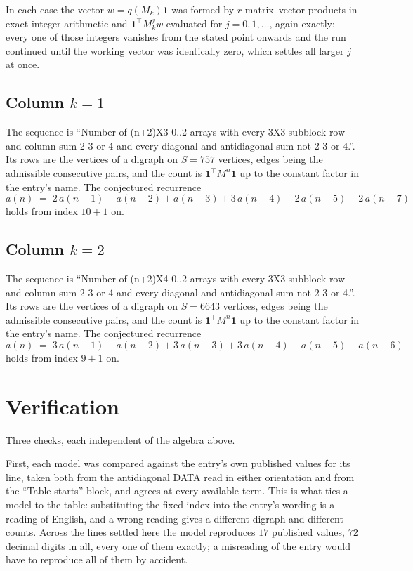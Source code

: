 \documentclass[11pt,a4paper]{article}
\theoremstyle{plain}
\theoremstyle{definition}
\begin{document}
In each case the vector $w=q(M_k)\mathbf{1}$ was formed by $r$ matrix--vector products in
exact integer arithmetic and $\mathbf{1}^{\!\top}M_k^{j}w$ evaluated for $j=0,1,\dots$,
again exactly; every one of those integers vanishes from the stated point onwards and the run
continued until the working vector was identically zero, which settles all larger $j$ at once.

\subsection*{Column $k$$=1$}
The sequence is ``Number of (n+2)X3 0..2 arrays with every 3X3 subblock row and column sum 2 3 or 4 and every diagonal and antidiagonal sum not 2 3 or 4.''. Its rows are the vertices of a digraph on
$S=757$ vertices, edges being the admissible consecutive pairs, and the count is
$\mathbf{1}^{\!\top}M^{n}\mathbf{1}$ up to the constant factor in the entry's name.
The conjectured recurrence
\[
a(n)\;=\;2\,a(n-1) - a(n-2) + a(n-3) + 3\,a(n-4) - 2\,a(n-5) - 2\,a(n-7)
\]
holds from index $10+1$ on.

\subsection*{Column $k$$=2$}
The sequence is ``Number of (n+2)X4 0..2 arrays with every 3X3 subblock row and column sum 2 3 or 4 and every diagonal and antidiagonal sum not 2 3 or 4.''. Its rows are the vertices of a digraph on
$S=6643$ vertices, edges being the admissible consecutive pairs, and the count is
$\mathbf{1}^{\!\top}M^{n}\mathbf{1}$ up to the constant factor in the entry's name.
The conjectured recurrence
\[
a(n)\;=\;3\,a(n-1) - a(n-2) + 3\,a(n-3) + 3\,a(n-4) - a(n-5) - a(n-6)
\]
holds from index $9+1$ on.

\section{Verification}

Three checks, each independent of the algebra above.

First, each model was compared against the entry's own published values for its line, taken
both from the antidiagonal DATA read in either orientation and from the ``Table starts''
block, and agrees at every available term. This is what ties a model to the table:
substituting the fixed index into the entry's wording is a reading of English, and a wrong
reading gives a different digraph and different counts. Across the lines settled here the
model reproduces $17$ published values, $72$ decimal digits in all, every one of
them exactly; a misreading of the entry would have to reproduce all of them by accident.
\end{document}
